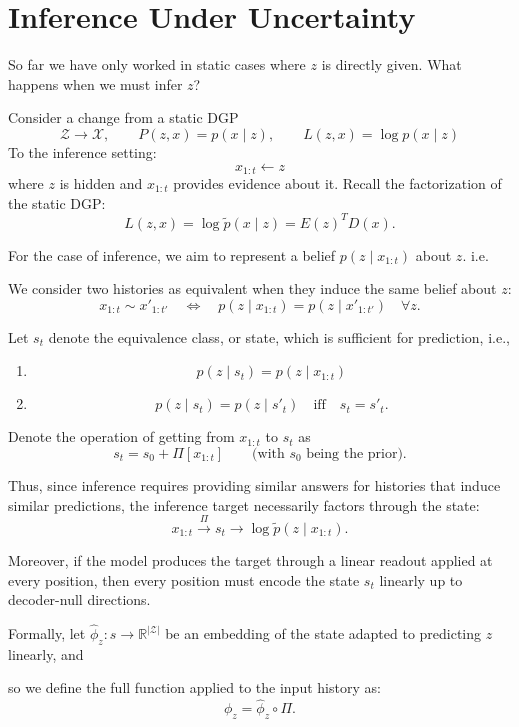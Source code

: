 \documentclass[11pt]{article}
\begin{document}
{\clearpage

\section{Inference Under Uncertainty}

So far we have only worked in static cases where $z$ is directly given. What happens when we must infer $z$?

Consider a change from a static DGP
\[
\mathcal Z\longrightarrow\mathcal X,
\qquad
P(z,x)=p(x\mid z),
\qquad
L(z,x)=\log p(x\mid z)
\]
To the inference setting:
\[
x_{1:t}\longleftarrow z
\]
where $z$ is hidden and $x_{1:t}$ provides evidence about it. Recall the factorization of the static DGP:
\[
L(z,x)=\log\tilde p(x\mid z)=E(z)^T D(x).
\]

For the case of inference, we aim to represent a belief $p(z\mid x_{1:t})$ about $z$. i.e.

We consider two histories as equivalent when they induce the same belief about $z$:
\[
x_{1:t}\sim x'_{1:t'}
\quad\Longleftrightarrow\quad
p(z\mid x_{1:t})=p(z\mid x'_{1:t'})
\quad\forall z.
\]

Let $s_t$ denote the equivalence class, or state, which is sufficient for prediction, i.e.,
\begin{enumerate}[label=(\arabic*)]
\item
\[
p(z\mid s_t)=p(z\mid x_{1:t})
\]

\item
\[
p(z\mid s_t)=p(z\mid s'_t)\quad\text{iff}\quad s_t=s'_t.
\]
\end{enumerate}

Denote the operation of getting from $x_{1:t}$ to $s_t$ as
\[
s_t=s_0+\Pi[x_{1:t}]
\qquad
\text{(with $s_0$ being the prior).}
\]

Thus, since inference requires providing similar answers for histories that induce similar predictions, the inference target necessarily factors through the state:
\[
x_{1:t}\xrightarrow{\Pi}s_t\longrightarrow\log\tilde p(z\mid x_{1:t}).
\]

Moreover, if the model produces the target through a linear readout applied at every position, then every position must encode the state $s_t$ linearly up to decoder-null directions.

Formally, let $\hat\phi_z:s\to\mathbb R^{|\mathcal Z|}$ be an embedding of the state adapted to predicting $z$ linearly, and

so we define the full function applied to the input history as:
\[
\phi_z=\hat\phi_z\circ\Pi.
\]

}
\end{document}
